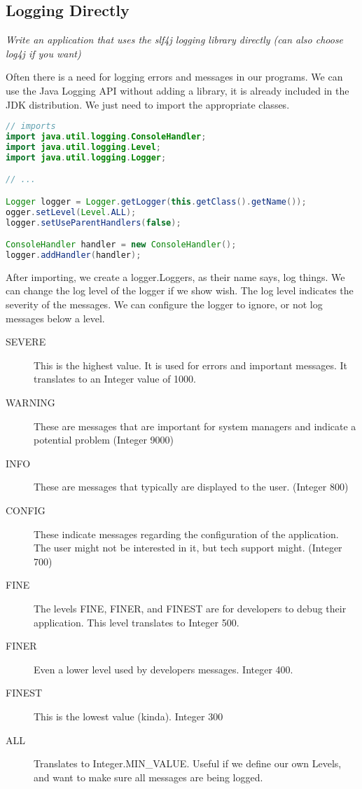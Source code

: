 \subsection{Logging Directly}
\textit{Write an application that uses the slf4j logging library directly (can also choose log4j if you want)}

Often there is a need for logging errors and messages in our programs. We can use the Java Logging API without adding a library, it is already included in the JDK distribution. We just need to import the appropriate classes.
\label{javaloggerlst}\begin{lstlisting}[language=Java]
// imports
import java.util.logging.ConsoleHandler;
import java.util.logging.Level;
import java.util.logging.Logger;

// ...

Logger logger = Logger.getLogger(this.getClass().getName());
ogger.setLevel(Level.ALL);
logger.setUseParentHandlers(false);

ConsoleHandler handler = new ConsoleHandler();
logger.addHandler(handler);
\end{lstlisting}

After importing, we create a logger.Loggers, as their name says, log things. We can change the log level of the logger if we show wish. The log level indicates the severity of the messages. We can configure the logger to ignore, or not log messages below a level.
\begin{description}
\item[SEVERE] This is the highest value. It is used for errors and important messages. It translates to an Integer value of 1000.
\item[WARNING] These are messages that are important for system managers and indicate a potential problem (Integer 9000)
\item[INFO] These are messages that typically are displayed to the user. (Integer 800)
\item[CONFIG] These indicate messages regarding the configuration of the application. The user might not be interested in it, but tech support might. (Integer 700)
\item[FINE] The levels FINE, FINER, and FINEST are for developers to debug their application. This level translates to Integer 500.
\item[FINER] Even a lower level used by developers messages. Integer 400.
\item[FINEST] This is the lowest value (kinda). Integer 300
\item[ALL] Translates to Integer.MIN\_VALUE. Useful if we define our own Levels, and want to make sure all messages are being logged.
\end{description}

